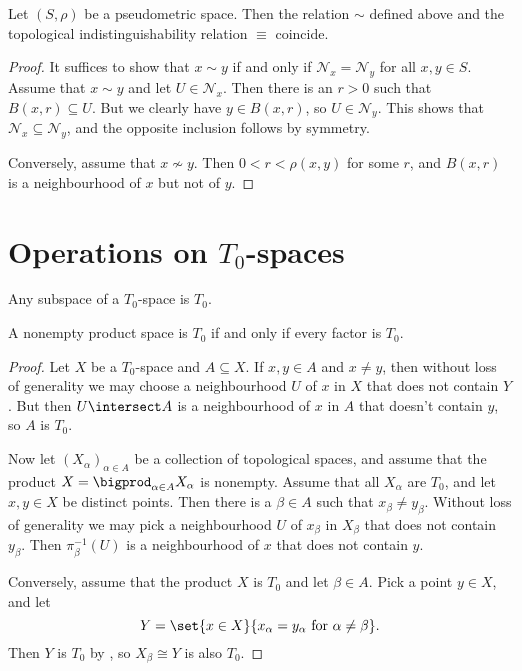 \documentclass[article, a4paper, 11pt, oneside]{memoir}
\numberwithin{equation}{chapter}
\newcommand{\preim}{^{-1}}
\newcommand{\calN}{\mathcal{N}}
\newcommand{\nhoodfilter}[1]{\calN_{#1}}
\begin{document}
\begin{proposition}
    Let $(S,\rho)$ be a pseudometric space. Then the relation $\sim$ defined above and the topological indistinguishability relation $\equiv$ coincide.
\end{proposition}

\begin{proof}
    It suffices to show that $x \sim y$ if and only if $\nhoodfilter{x} = \nhoodfilter{y}$ for all $x,y \in S$. Assume that $x \sim y$ and let $U \in \nhoodfilter{x}$. Then there is an $r > 0$ such that $B(x,r) \subseteq U$. But we clearly have $y \in B(x,r)$, so $U \in \nhoodfilter{y}$. This shows that $\nhoodfilter{x} \subseteq \nhoodfilter{y}$, and the opposite inclusion follows by symmetry.

    Conversely, assume that $x \not\sim y$. Then $0 < r < \rho(x,y)$ for some $r$, and $B(x,r)$ is a neighbourhood of $x$ but not of $y$.
\end{proof}


\section[Operations on T0-spaces]{Operations on $T_0$-spaces}


\begin{proposition}
    \label{thm:T0-properties}
    \begin{enumprop}
        \item \label{enum:T0-subspace} Any subspace of a $T_0$-space is $T_0$.
        \item A nonempty product space is $T_0$ if and only if every factor is $T_0$.
    \end{enumprop}
\end{proposition}

\begin{proof}
    Let $X$ be a $T_0$-space and $A \subseteq X$. If $x,y \in A$ and $x \neq y$, then without loss of generality we may choose a neighbourhood $U$ of $x$ in $X$ that does not contain $Y$. But then $U \intersect A$ is a neighbourhood of $x$ in $A$ that doesn't contain $y$, so $A$ is $T_0$.

    Now let $(X_\alpha)_{\alpha \in A}$ be a collection of topological spaces, and assume that the product $X = \bigprod_{\alpha \in A} X_\alpha$ is nonempty. Assume that all $X_\alpha$ are $T_0$, and let $x,y \in X$ be distinct points. Then there is a $\beta \in A$ such that $x_\beta \neq y_\beta$. Without loss of generality we may pick a neighbourhood $U$ of $x_\beta$ in $X_\beta$ that does not contain $y_\beta$. Then $\pi_\beta\preim(U)$ is a neighbourhood of $x$ that does not contain $y$.

    Conversely, assume that the product $X$ is $T_0$ and let $\beta \in A$. Pick a point $y \in X$, and let
    \begin{equation*}
        Y
            = \set{x \in X}{x_\alpha = y_\alpha \text{ for } \alpha \neq \beta}.
    \end{equation*}
    Then $Y$ is $T_0$ by , so $X_\beta \cong Y$ is also $T_0$.
\end{proof}
\end{document}

